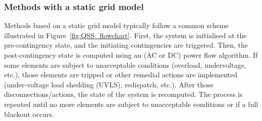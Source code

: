 




\subsubsection{Methods with a static grid model}
\label{sec:QSSmethods}

Methods based on a static grid model typically follow a common scheme illustrated in Figure~\ref{fig:QSS_flowchart}. First, the system is initialised at the pre-contingency state, and the initiating contingencies are triggered. Then, the post-contingency state is computed using an (AC or DC) power flow algorithm. If some elements are subject to unacceptable conditions (\eg overload, undervoltage, etc.), those elements are tripped or other remedial actions are implemented (\eg under-voltage load shedding (UVLS), redispatch, etc.). After those disconnections/actions, the state of the system is recomputed. The process is repeated until no more elements are subject to unacceptable conditions or if a full blackout occurs.


